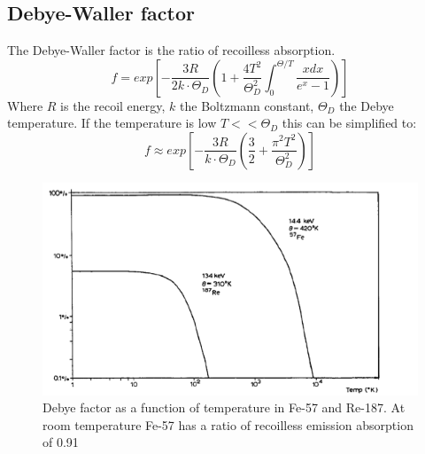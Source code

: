 \subsection{Debye-Waller factor}
The Debye-Waller factor is the ratio of recoilless absorption.
\begin{equation}
f = exp \left[ -\frac{3R}{2k \cdot \Theta_D} \left(1+ \frac{4T^2}{\Theta_D^2}\int_{0}^{\Theta/T}\frac{xdx}{e^x-1}\right) \right]
\end{equation}
Where $R$ is the recoil energy, $k$ the Boltzmann constant, $\Theta_D$ the Debye temperature. 
If the temperature is low $T<<\Theta_D$ this can be simplified to:
\begin{equation}
f \approx exp\left[ -\frac{3R}{k \cdot \Theta_D} \left( \frac{3}{2}+\frac{\pi^2 T^2}{\Theta_D^2}\right) \right]
\end{equation}

\begin{figure}
\centering
\includegraphics[width=0.7\linewidth]{graphics/Debeyfactor}
\caption[Debey factors]{Debye factor as a function of temperature in Fe-57 and Re-187. At room temperature Fe-57 has a ratio of recoilless emission absorption of 0.91}
\label{fig:principles:Debeyfactor}
\end{figure}

